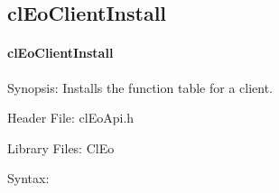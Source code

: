\begin{flushleft}
  \newpage
\subsection{clEoClientInstall}
\hypertarget{pageeo106}{}\paragraph{cl\-Eo\-Client\-Install}\label{pageeo106}
\begin{Desc}
\item[Synopsis:]Installs the function table for a client.\end{Desc}
\begin{Desc}
\item[Header File:]clEoApi.h\end{Desc}
\begin{Desc}
\item[Library Files:]Cl\-Eo\end{Desc}
\begin{Desc}
\item[Syntax:]


\end{Desc}
\end{flushleft}
